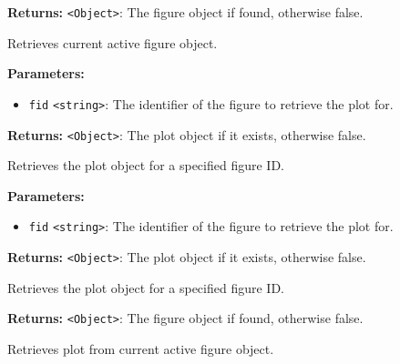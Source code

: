 \documentclass[12pt,a4paper]{article}
\begin{document}
\noindent \textbf{Returns:} \texttt{<Object>}: The figure object if found, otherwise \textasciigrave{}false\textasciigrave{}.

\noindent Retrieves current active figure object.

\vspace{5mm}
\noindent {}


\noindent \textbf{Parameters:}
\begin{itemize}
  \item \texttt{fid} \texttt{<string>}: The identifier of the figure to retrieve the plot for.
\end{itemize}

\noindent \textbf{Returns:} \texttt{<Object>}: The plot object if it exists, otherwise \textasciigrave{}false\textasciigrave{}.

\noindent Retrieves the plot object for a specified figure ID.

\vspace{5mm}
\noindent {}


\noindent \textbf{Parameters:}
\begin{itemize}
  \item \texttt{fid} \texttt{<string>}: The identifier of the figure to retrieve the plot for.
\end{itemize}

\noindent \textbf{Returns:} \texttt{<Object>}: The plot object if it exists, otherwise \textasciigrave{}false\textasciigrave{}.

\noindent Retrieves the plot object for a specified figure ID.

\vspace{5mm}
\noindent {}


\noindent \textbf{Returns:} \texttt{<Object>}: The figure object if found, otherwise \textasciigrave{}false\textasciigrave{}.

\noindent Retrieves plot from current active figure object.

\vspace{5mm}
\noindent {}
\end{document}
